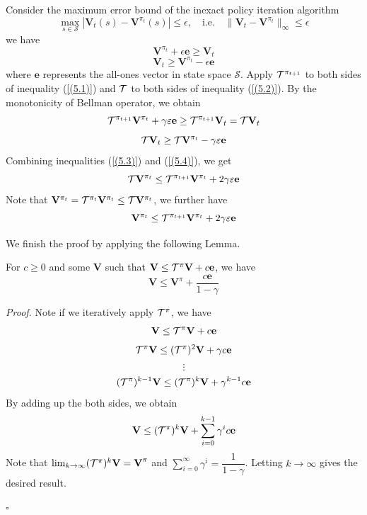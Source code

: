 \begin{Solution}
Consider the maximum error bound of the inexact policy iteration algorithm
$$
\max_{s \in \mathcal{S}} | \mathbf{V}_t(s) - \mathbf{V}^{\pi_t}(s) | \le \epsilon, \quad \text{i.e.} \quad \|\mathbf{V}_t - \mathbf{V}^{\pi_t}\|_\infty \leq \epsilon
$$
we have
\begin{equation} \label{(5.1)}
    \mathbf{V}^{\pi_t} + \epsilon \textbf{e} \geq \mathbf{V}_t
\end{equation}
\begin{equation} \label{(5.2)}
    \mathbf{V}_t \geq \mathbf{V}^{\pi_t} - \epsilon \textbf{e}
\end{equation}
where $\textbf{e}$ represents the all-ones vector in state space $\mathcal{S}$.
Apply $\mathcal{T}^{\pi_{t+1}}$ to both sides of inequality (\ref{(5.1)}) and $\mathcal{T}$ to both sides of inequality (\ref{(5.2)}). By the monotonicity of Bellman operator, we obtain
\begin{equation} \label{(5.3)}
    \mathcal{T}^{\pi_{t+1}} \mathbf{V}^{\pi_t} + \gamma \varepsilon \textbf{e} \geq \mathcal{T}^{\pi_{t+1}} \mathbf{V}_t = \mathcal{T} \mathbf{V}_t
\end{equation}
\begin{equation} \label{(5.4)}
    \mathcal{T} \mathbf{V}_t \geq \mathcal{T} \mathbf{V}^{\pi_t} - \gamma \varepsilon \textbf{e}
\end{equation}
Combining inequalities (\ref{(5.3)}) and (\ref{(5.4)}), we get
\begin{equation} \label{(5.5)}
    \mathcal{T} \mathbf{V}^{\pi_t} \leq \mathcal{T}^{\pi_{t+1}} \mathbf{V}^{\pi_t} + 2 \gamma \varepsilon \textbf{e}
\end{equation}
Note that $\mathbf{V}^{\pi_t} = \mathcal{T}^{\pi_t} \mathbf{V}^{\pi_t} \leq \mathcal{T} \mathbf{V}^{\pi_t}$, we further have
\begin{equation} \label{(5.6)}
    \mathbf{V}^{\pi_t} \leq \mathcal{T}^{\pi_{t+1}} \mathbf{V}^{\pi_t} + 2 \gamma \varepsilon \textbf{e}
\end{equation}

We finish the proof by applying the following Lemma.

\vspace{1em}
\begin{lemma}
For $c \geq 0$ and some $\mathbf{V}$ such that $\mathbf{V} \leq \mathcal{T}^{\pi} \mathbf{V} + c \mathbf{e}$, we have
$$
\mathbf{V} \leq \mathbf{V}^\pi + \dfrac{c \mathbf{e}}{1 - \gamma}
$$
\end{lemma}

\textit{Proof.} \quad
Note if we iteratively apply $\mathcal{T}^\pi$, we have
$$
\mathbf{V} \leq \mathcal{T}^{\pi} \mathbf{V} + c \mathbf{e}
$$
$$
\mathcal{T}^{\pi} \mathbf{V} \leq (\mathcal{T}^{\pi})^2 \mathbf{V} + \gamma c \mathbf{e}
$$
$$
\vdots
$$
$$
(\mathcal{T}^{\pi})^{k-1} \mathbf{V} \leq (\mathcal{T}^{\pi})^k \mathbf{V} + \gamma^{k-1} c \mathbf{e}
$$
By adding up the both sides, we obtain
$$
\textbf{V} \leq (\mathcal{T}^\pi)^k \textbf{V} + \sum_{i=0}^{k-1} \gamma^{i} c \textbf{e}
$$
Note that $\lim_{k \rightarrow \infty} (\mathcal{T}^\pi)^k \textbf{V} = \textbf{V}^\pi$ and $\sum_{i=0}^\infty \gamma^{i} = \dfrac{1}{1-\gamma}$. Letting $k \rightarrow \infty$ gives the desired result. \begin{flushright} $\square$ \end{flushright}


\end{Solution}
